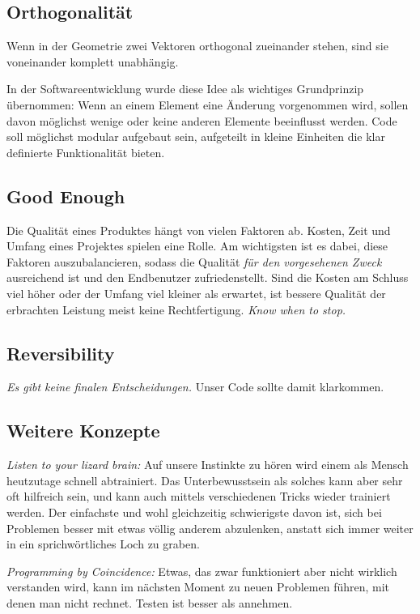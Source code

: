 \documentclass[10pt, oneside]{article}
\begin{document}
\subsection{Orthogonalität}
Wenn in der Geometrie zwei Vektoren orthogonal zueinander stehen, sind sie voneinander komplett unabhängig.

In der Softwareentwicklung wurde diese Idee als wichtiges Grundprinzip übernommen: Wenn an einem Element eine Änderung vorgenommen wird, sollen davon möglichst wenige oder keine anderen Elemente beeinflusst werden. 
Code soll möglichst modular aufgebaut sein, aufgeteilt in kleine Einheiten die klar definierte Funktionalität bieten.

\subsection{Good Enough}
Die Qualität eines Produktes hängt von vielen Faktoren ab. Kosten, Zeit und Umfang eines Projektes spielen eine Rolle.
Am wichtigsten ist es dabei, diese Faktoren auszubalancieren, sodass die Qualität \emph{für den vorgesehenen Zweck} ausreichend ist und den Endbenutzer zufriedenstellt.
Sind die Kosten am Schluss viel höher oder der Umfang viel kleiner als erwartet, ist bessere Qualität der erbrachten Leistung meist keine Rechtfertigung. \emph{Know when to stop.}

\subsection{Reversibility}
\emph{Es gibt keine finalen Entscheidungen.} Unser Code sollte damit klarkommen.

\subsection{Weitere Konzepte}

\emph{Listen to your lizard brain: } Auf unsere Instinkte zu hören wird einem als Mensch heutzutage schnell abtrainiert. Das Unterbewusstsein als solches 
kann aber sehr oft hilfreich sein, und kann auch mittels verschiedenen Tricks wieder trainiert werden. Der einfachste und wohl gleichzeitig schwierigste davon ist, 
sich bei Problemen besser mit etwas völlig anderem abzulenken, anstatt sich immer weiter in ein sprichwörtliches Loch zu graben.


\emph{Programming by Coincidence: } Etwas, das zwar funktioniert aber nicht wirklich verstanden wird, kann im nächsten Moment zu neuen Problemen führen, mit denen man nicht rechnet.
Testen ist besser als annehmen.
\end{document}

